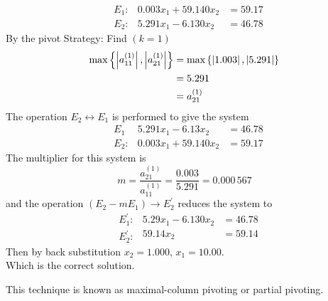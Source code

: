\documentclass[12pt,class=book,crop=false]{standalone}
\begin{document}
\begin{soln}
    \[
        \left.\begin{aligned}
             & E_1: \\
             & E_2:
        \end{aligned}\right.
        \left.\begin{aligned}
            0.003x_1+59.140x_2 & =59.17 \\
            5.291x_1-6.130x_2  & =46.78
        \end{aligned}\right.
    \]
    By the pivot Strategy: Find \(( k=1 )\)
    \begin{align*}
        \text{max} \left\{ \left\vert a_{11}^{(1)}\right\vert, \left\vert a_{21}^{(1)}\right\vert \right\} & =\text{max} \left\{ \left\vert1.003\right\vert,\left\vert5.291\right\vert\right\} \\
                                                                       & =5.291\\
                                                                       & =a_{21}^{(1)}
    \end{align*}
    The operation \( E_2 \longleftrightarrow E_1 \) is performed to give the system
    \[
        \left.\begin{aligned}
            & E_1 \\
            & E_2:
        \end{aligned}\right.
        \left.\begin{aligned}
            5.291x_1-6.13x_2&=46.78\\
            0.003x_1+59.140x_2 & =59.17
        \end{aligned}\right.
    \]
    The multiplier for this system is 
    \[m=\frac{a_{21}^{(1)}}{a_{11}^{(1)}}=\frac{0.003}{5.291}=0.000\,567
    \]
    and the operation \( (E_2-mE_1)\rightarrow E_2^{'} \) reduces the system to 
    \[
        \left.\begin{aligned}
             & E_1^{'}: \\
             & E_2^{'}:
        \end{aligned}\right.
        \left.\begin{aligned}
            5.29 x_1-6.130x_2 & =46.78     \\
            59.14x_2         & =59.14
        \end{aligned}\right.
    \]
    Then by back substitution \( x_2=1.000 \), \( x_1=10.00 \).\\
    Which is the correct solution.
\end{soln}
This technique is known as maximal-column pivoting or partial pivoting.
\end{document}

